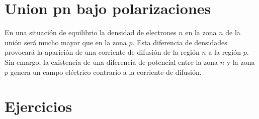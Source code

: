 \section{Union pn bajo polarizaciones}

En una situación de equilibrio la densidad de electrones $n$ en la zona $n$ de la unión será mucho mayor que en la zona $p$. Esta diferencia de densidades provocará la aparición de una corriente de difusión de la región $n$ a la región $p$. Sin emargo, la existencia de una diferencia de potencial entre la zona $n$ y la zona $p$ genera un campo eléctrico contrario a la corriente de difusión.




\newpage

\section{Ejercicios}


\tcbstartrecording

